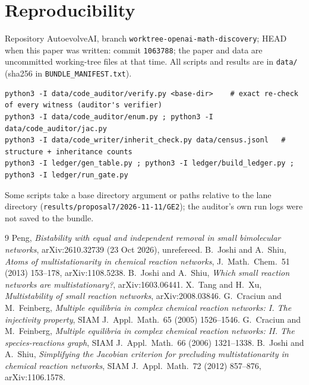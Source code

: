 \documentclass[11pt]{article}
\begin{document}
\section{Reproducibility}\label{sec:repro}
Repository AutoevolveAI, branch \texttt{worktree-openai-math-discovery}; HEAD when this paper was written: commit \texttt{1063788}; the paper and data are uncommitted working-tree files at that time. All scripts and results are in \texttt{data/} (sha256 in \texttt{BUNDLE\_MANIFEST.txt}).
\begin{lstlisting}[basicstyle=\ttfamily\scriptsize]
python3 -I data/code_auditor/verify.py <base-dir>    # exact re-check of every witness (auditor's verifier)
python3 -I data/code_auditor/enum.py ; python3 -I data/code_auditor/jac.py
python3 -I data/code_writer/inherit_check.py data/census.jsonl   # structure + inheritance counts
python3 -I ledger/gen_table.py ; python3 -I ledger/build_ledger.py ; python3 -I ledger/run_gate.py
\end{lstlisting}
Some scripts take a base directory argument or paths relative to the lane directory (\texttt{results/proposal7/2026-11-11/GE2}); the auditor's own run logs were not saved to the bundle.

\begin{thebibliography}{9}\small
{} Peng, \emph{Bistability with equal and independent removal in small bimolecular networks}, arXiv:2610.32739 (23 Oct 2026), unrefereed.
 B.~Joshi and A.~Shiu, \emph{Atoms of multistationarity in chemical reaction networks}, J.\ Math.\ Chem.\ 51 (2013) 153--178, arXiv:1108.5238.
 B.~Joshi and A.~Shiu, \emph{Which small reaction networks are multistationary?}, arXiv:1603.06441.
 X.~Tang and H.~Xu, \emph{Multistability of small reaction networks}, arXiv:2008.03846.
 G.~Craciun and M.~Feinberg, \emph{Multiple equilibria in complex chemical reaction networks: I. The injectivity property}, SIAM J.\ Appl.\ Math.\ 65 (2005) 1526--1546.
 G.~Craciun and M.~Feinberg, \emph{Multiple equilibria in complex chemical reaction networks: II. The species-reactions graph}, SIAM J.\ Appl.\ Math.\ 66 (2006) 1321--1338.
 B.~Joshi and A.~Shiu, \emph{Simplifying the Jacobian criterion for precluding multistationarity in chemical reaction networks}, SIAM J.\ Appl.\ Math.\ 72 (2012) 857--876, arXiv:1106.1578.
\end{thebibliography}
\end{document}
